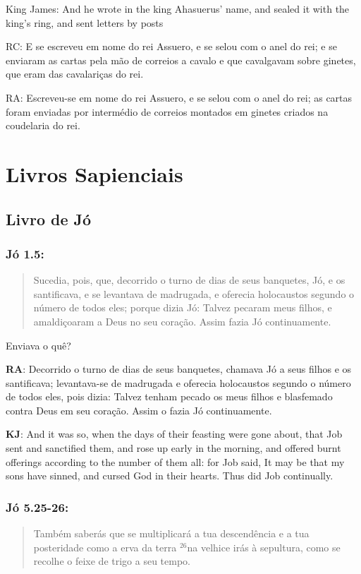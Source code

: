 King James: And he wrote in the king Ahasuerus’ name, and sealed it with the king’s ring, and sent letters by posts 

RC: E se escreveu em nome do rei Assuero, e se selou com o anel do rei; e se enviaram as cartas pela mão de correios a cavalo e que cavalgavam sobre ginetes, que eram das cavalariças do rei.

RA: Escreveu-se em nome do rei Assuero, e se selou com o anel do rei; as cartas foram enviadas por intermédio de correios montados em ginetes criados na coudelaria do rei.

\chapter{Livros Sapienciais}
\section{Livro de Jó}
\subsection*{Jó 1.5:} 
 \begin{quote}
    \small
Sucedia, pois, que, decorrido o turno de dias de seus banquetes,  Jó, e os santificava, e se levantava de madrugada, e oferecia holocaustos segundo o número de todos eles; porque dizia Jó: Talvez pecaram meus filhos, e amaldiçoaram a Deus no seu coração. Assim fazia Jó continuamente.
\end{quote}

Enviava o quê?

\textbf{RA}: Decorrido o turno de dias de seus banquetes, chamava Jó a seus filhos e os santificava; levantava-se de madrugada e oferecia holocaustos segundo o número de todos eles, pois dizia: Talvez tenham pecado os meus filhos e blasfemado contra Deus em seu coração. Assim o fazia Jó continuamente.

\textbf{KJ}: And it was so, when the days of their feasting were gone about, that Job sent and sanctified them, and rose up early in the morning, and offered burnt offerings according to the number of them all: for Job said, It may be that my sons have sinned, and cursed God in their hearts. Thus did Job continually.

\subsection*{Jó 5.25-26:} 
 \begin{quote}
    \small
 Também saberás que se multiplicará a tua descendência e a tua posteridade como a erva da terra\uwave{,} $^{\mathrm{26}}$na velhice irás à sepultura, como se recolhe o feixe de trigo a seu tempo.
\end{quote}

